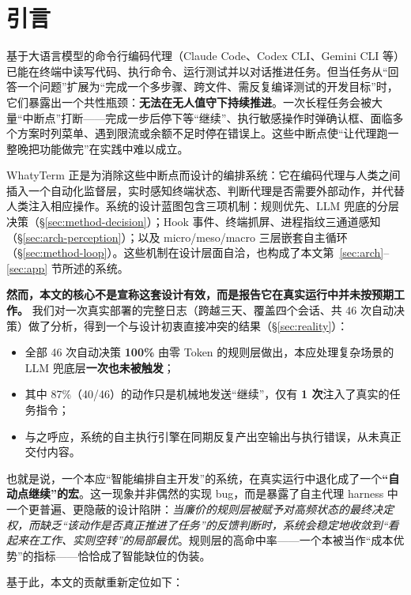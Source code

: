 \section{引言}
\label{sec:intro}

基于大语言模型的命令行编码代理（Claude Code、Codex CLI、Gemini CLI 等）已能在终端中读写代码、执行命令、运行测试并以对话推进任务。但当任务从“回答一个问题”扩展为“完成一个多步骤、跨文件、需反复编译测试的开发目标”时，它们暴露出一个共性瓶颈：\textbf{无法在无人值守下持续推进}。一次长程任务会被大量“中断点”打断——完成一步后停下等“继续”、执行敏感操作时弹确认框、面临多个方案时列菜单、遇到限流或余额不足时停在错误上。这些中断点使“让代理跑一整晚把功能做完”在实践中难以成立。

WhatyTerm 正是为消除这些中断点而设计的编排系统：它在编码代理与人类之间插入一个自动化监督层，实时感知终端状态、判断代理是否需要外部动作，并代替人类注入相应操作。系统的设计蓝图包含三项机制：规则优先、LLM 兜底的分层决策（\S\ref{sec:method-decision}）；Hook 事件、终端抓屏、进程指纹三通道感知（\S\ref{sec:arch-perception}）；以及 micro/meso/macro 三层嵌套自主循环（\S\ref{sec:method-loop}）。这些机制在设计层面自洽，也构成了本文第~\ref{sec:arch}--\ref{sec:app} 节所述的系统。

\textbf{然而，本文的核心不是宣称这套设计有效，而是报告它在真实运行中并未按预期工作。} 我们对一次真实部署的完整日志（跨越三天、覆盖四个会话、共 46 次自动决策）做了分析，得到一个与设计初衷直接冲突的结果（\S\ref{sec:reality}）：

\begin{itemize}
  \item 全部 46 次自动决策\textbf{ 100\% }由零 Token 的规则层做出，本应处理复杂场景的 LLM 兜底层\textbf{一次也未被触发}；
  \item 其中 87\%（40/46）的动作只是机械地发送“继续”，仅有 \textbf{1 次}注入了真实的任务指令；
  \item 与之呼应，系统的自主执行引擎在同期反复产出空输出与执行错误，从未真正交付内容。
\end{itemize}

也就是说，一个本应“智能编排自主开发”的系统，在真实运行中退化成了一个\textbf{“自动点继续”的宏}。这一现象并非偶然的实现 bug，而是暴露了自主代理 harness 中一个更普遍、更隐蔽的设计陷阱：\emph{当廉价的规则层被赋予对高频状态的最终决定权，而缺乏“该动作是否真正推进了任务”的反馈判断时，系统会稳定地收敛到“看起来在工作、实则空转”的局部最优}。规则层的高命中率——一个本被当作“成本优势”的指标——恰恰成了智能缺位的伪装。

基于此，本文的贡献重新定位如下：

